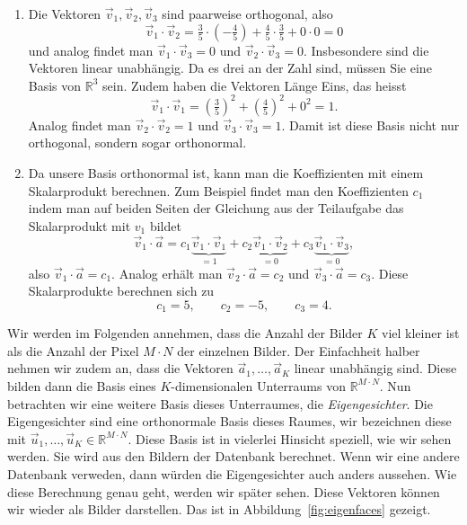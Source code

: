 \begin{losung*}
	\phantom{text}
	\begin{enumerate}[label=(\alph*)]
		\item Die Vektoren $\vec v_1,\vec v_2,\vec v_3$ sind paarweise orthogonal, also
		\begin{equation*}
			\vec v_1\cdot\vec v_2= \tfrac{3}{5}\cdot\left(-\tfrac{4}{5}\right)+\tfrac{4}{5}\cdot\tfrac{3}{5}+0\cdot 0=0
		\end{equation*}
		und analog findet man $\vec v_1\cdot\vec v_3=0$ und $\vec v_2\cdot\vec v_3=0$.
		Insbesondere sind die Vektoren linear unabhängig.
		Da es drei an der Zahl sind, müssen Sie eine Basis von $\mathbb R^3$ sein.
		Zudem haben die Vektoren Länge Eins, das heisst
		\begin{equation*}
			\vec v_1\cdot\vec v_1= \left(\tfrac{3}{5}\right)^2+\left(\tfrac{4}{5}\right)^2+0^2=1.
		\end{equation*}
		Analog findet man $\vec v_2\cdot\vec v_2=1$ und $\vec v_3\cdot\vec v_3=1$.
		Damit ist diese Basis nicht nur orthogonal, sondern sogar orthonormal.
		\item Da unsere Basis orthonormal ist, kann man die Koeffizienten mit einem Skalarprodukt berechnen.
		Zum Beispiel findet man den Koeffizienten $c_1$ indem man auf beiden Seiten der Gleichung aus der Teilaufgabe das Skalarprodukt mit $v_1$ bildet
		\begin{equation*}
			\vec v_1\cdot\vec a=c_1\underbrace{\vec v_1\cdot\vec v_1}_{=1}+c_2\underbrace{\vec v_1\cdot\vec v_2}_{=0}+c_3\underbrace{\vec v_1\cdot\vec v_3}_{=0},
		\end{equation*}
		also $\vec v_1\cdot\vec a=c_1$.
		Analog erhält man $\vec v_2\cdot\vec a=c_2$ und $\vec v_3\cdot\vec a=c_3$.
		Diese Skalarprodukte berechnen sich zu
		\begin{equation*}
			c_1=5,\quad\quad c_2=-5,\quad\quad c_3=4.
		\end{equation*}
	\end{enumerate}
\end{losung*}

Wir werden im Folgenden annehmen, dass die Anzahl der Bilder $K$ viel kleiner ist als die Anzahl der Pixel $M\cdot N$ der einzelnen Bilder.
Der Einfachheit halber nehmen wir zudem an, dass die Vektoren $\vec a_1,\ldots,\vec a_K$ linear unabhängig sind.
Diese bilden dann die Basis eines $K$-dimensionalen Unterraums von $\mathbb R^{M\cdot N}$.
Nun betrachten wir eine weitere Basis dieses Unterraumes, die \textit{Eigengesichter}.
Die Eigengesichter sind eine orthonormale Basis dieses Raumes, wir bezeichnen diese mit $\vec u_1,\dots,\vec u_K\in\mathbb R^{M\cdot N}$.
Diese Basis ist in vielerlei Hinsicht speziell, wie wir sehen werden.
Sie wird aus den Bildern der Datenbank berechnet.
Wenn wir eine andere Datenbank verweden, dann würden die Eigengesichter auch anders aussehen.
Wie diese Berechnung genau geht, werden wir später sehen.
Diese Vektoren können wir wieder als Bilder darstellen.
Das ist in Abbildung~\ref{fig:eigenfaces} gezeigt.

